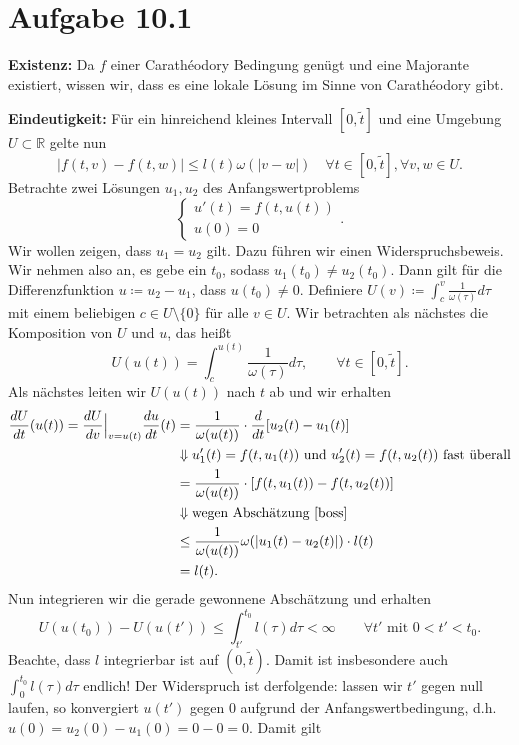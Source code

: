 \documentclass[a4paper]{article}
\theoremstyle{plain}
\begin{document}
	
\section*{Aufgabe 10.1}
\textbf{Existenz: }Da $f$ einer Carathéodory Bedingung genügt und eine Majorante existiert, wissen wir, dass es eine lokale Lösung im Sinne von Carathéodory gibt. 
	
\textbf{Eindeutigkeit:} Für ein hinreichend kleines Intervall $[0, \tilde t]$ und eine Umgebung $U \subset \mathbb R$ gelte nun
\begin{equation}\label{boss}
	|f(t,v) - f(t,w)| \leq l(t)\omega(|v-w|) \quad \forall t \in [0, \tilde t], \forall v,w \in U.
\end{equation}
Betrachte zwei Lösungen $u_1, u_2$ des Anfangswertproblems
\[
	\begin{cases}
		u'(t) = f(t,u(t)) \\ u(0) = 0
	\end{cases}.
\]
Wir wollen zeigen, dass $u_1 = u_2$ gilt. Dazu führen wir einen Widerspruchsbeweis. Wir nehmen also an, es gebe ein $t_0$, sodass $u_1(t_0) \neq u_2(t_0)$. Dann gilt für die Differenzfunktion $u \coloneqq u_2 - u_1$, dass $u(t_0) \neq 0$. Definiere $U(v) \coloneqq \int^v_{c} \frac{1}{\omega(\tau)} d\tau$ mit einem beliebigen $c \in U \setminus \{ 0 \}$ für alle $v \in U$. Wir betrachten als nächstes die Komposition von $U$ und $u$, das heißt
\[
	U(u(t)) = \int^{u(t)}_{c} \frac{1}{\omega(\tau)}d\tau, \qquad \forall t \in [0, \tilde t].
\]
Als nächstes leiten wir $U(u(t))$ nach $t$ ab und wir erhalten
\begin{align*}
	\frac{dU}{dt}(u(t)) = \frac{dU}{dv}\Big \vert_{v = u(t)} \frac{du}{dt}(t) &= \frac{1}{\omega(u(t))} \cdot  \frac{d}{dt}[u_2(t)-u_1(t)] \\
	&\Downarrow \text{$u_1'(t) = f(t,u_1(t))$ und $u_2'(t) = f(t,u_2(t))$ fast überall} \\
	&=\frac{1}{\omega(u(t))} \cdot [f(t,u_1(t))-f(t,u_2(t))] \\
	&\Downarrow \text{wegen Abschätzung \eqref{boss}} \\
	&\leq \frac{1}{\omega(u(t))}  \omega(|u_1(t) - u_2(t)|)  \cdot l(t)\\
	&= l(t).
\end{align*}
Nun integrieren wir die gerade gewonnene Abschätzung und erhalten
\[
	U(u(t_0)) - U(u(t')) \leq \int^{t_0}_{t'} l(\tau) d\tau < \infty \qquad \forall t' \text{ mit } 0<t' < t_0.
\]
Beachte, dass $l$ integrierbar ist auf $(0,\tilde t)$. Damit ist insbesondere auch $\int^{t_0}_0 l(\tau) d\tau$ endlich! Der Widerspruch ist derfolgende: lassen wir $t'$ gegen null laufen, so konvergiert $u(t')$ gegen $0$ aufgrund der Anfangswertbedingung, d.h. $u(0) = u_2(0) - u_1(0) = 0-0 = 0$. Damit gilt
\end{document}
